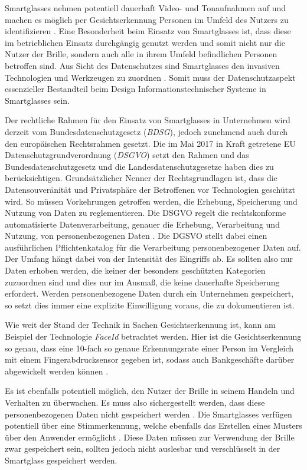 Smartglasses nehmen potentiell dauerhaft Video- und Tonaufnahmen auf und machen es möglich per Gesichtserkennung Personen im Umfeld des Nutzers zu identifizieren \cite[S.~38f]{Schwenke2016}. Eine Besonderheit beim Einsatz von Smartglasses ist, dass diese im betrieblichen Einsatz durchgängig genutzt werden und somit nicht nur die Nutzer der Brille, sondern auch alle in ihrem Umfeld befindlichen Personen betroffen sind. Aus Sicht des Datenschutzes sind Smartglasses den invasiven Technologien und Werkzeugen zu zuordnen \cite{Berkemeier2017}. Somit muss der Datenschutzaspekt essenzieller Bestandteil beim Design Informationstechnischer Systeme in Smartglasses sein. 

Der rechtliche Rahmen für den Einsatz von Smartglasses in Unternehmen wird derzeit vom Bundesdatenschutzgesetz (\emph{BDSG}), jedoch zunehmend auch durch den europäischen Rechtsrahmen gesetzt. Die im Mai 2017 in Kraft getretene EU Datenschutzgrundverordnung (\emph{DSGVO}) setzt den Rahmen und das Bundesdatenschutzgesetz und die Landesdatenschutzgesetze haben dies zu berücksichtigen. Grundsätzlicher Nenner der Rechtsgrundlagen ist, dass die Datensouveränität und Privatsphäre der Betroffenen vor Technologien geschützt wird. So müssen Vorkehrungen getroffen werden, die Erhebung, Speicherung und Nutzung von Daten zu reglementieren.
Die DSGVO regelt die rechtskonforme automatisierte Datenverarbeitung, genauer die Erhebung, Verarbeitung und Nutzung, von personenbezogenen Daten \cite{Berkemeier2017}. Die DGSVO stellt dabei einen ausführlichen Pflichtenkatalog für die Verarbeitung personenbezogener Daten auf. Der Umfang hängt dabei von der Intensität des Eingriffs ab. Es sollten also nur Daten erhoben werden, die keiner der besonders geschützten Kategorien zuzuordnen sind und dies nur im Ausmaß, die keine dauerhafte Speicherung erfordert. Werden personenbezogene Daten durch ein Unternehmen gespeichert, so setzt dies immer eine explizite Einwilligung voraus, die zu dokumentieren ist.

Wie weit der Stand der Technik in Sachen Gesichtserkennung ist, kann am Beispiel der Technologie \emph{FaceId} betrachtet werden. Hier ist die Gesichtserkennung so genau, dass eine 10-fach so genaue Erkennungsrate einer Person im Vergleich mit einem Fingerabdrucksensor gegeben ist, sodass auch Bankgeschäfte darüber abgewickelt werden können \cite{Apple2018a}. 

Es ist ebenfalls potentiell möglich, den Nutzer der Brille in seinem Handeln und Verhalten zu überwachen. Es muss also sichergestellt werden, dass diese personenbezogenen Daten nicht gespeichert werden \cite[S.~34]{Schwenke2016}. Die Smartglasses verfügen potentiell über eine Stimmerkennung, welche ebenfalls das Erstellen eines Musters über den Anwender ermöglicht \cite[S.~41]{Schwenke2016}. Diese Daten müssen zur Verwendung der Brille zwar gespeichert sein, sollten jedoch nicht auslesbar und verschlüsselt in der Smartglass gespeichert werden.

